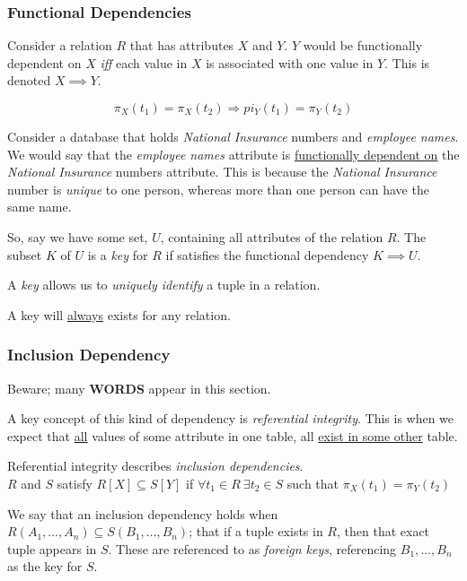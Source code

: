 \documentclass{article}
\begin{document}
\subsubsection*{Functional Dependencies}

Consider a relation $R$ that has attributes $X$ and $Y$. $Y$ would be functionally dependent on $X$ \textit{iff} each value in $X$ is associated with one value in $Y$. This is denoted $X \implies Y$.

$$\pi_X(t_1) = \pi_X(t_2) \Rightarrow pi_Y(t_1) = \pi_Y(t_2)$$

Consider a database that holds \textit{National Insurance} numbers and \textit{employee names}. We would say that the \textit{employee names} attribute is \underline{functionally dependent on} the \textit{National Insurance} numbers attribute. This is because the \textit{National Insurance} number is \textit{unique} to one person, whereas more than one person can have the same name.

So, say we have some set, $U$, containing all attributes of the relation $R$. The subset $K$ of $U$ is a \textit{key} for $R$ if satisfies the functional dependency $K \implies U$.

A \textit{key} allows us to \textit{uniquely identify} a tuple in a relation.

A key will \underline{always} exists for any relation.

\subsubsection*{Inclusion Dependency}

Beware; many \textbf{WORDS} appear in this section.

A key concept of this kind of dependency is \textit{referential integrity}. This is when we expect that \underline{all} values of some attribute in one table, all \underline{exist in some other} table.

Referential integrity describes \textit{inclusion dependencies}.\\

$R$ and $S$ satisfy $R[X] \subseteq S[Y]$ if $\forall t_1 \in R \: \exists t_2\in S $ such that $\pi_X(t_1) = \pi_Y(t_2)$

We say that an inclusion dependency holds when $R(A_1, \ldots, A_n) \subseteq S(B_1, \ldots, B_n)$; that if a tuple exists in $R$, then that exact tuple appears in $S$. These are referenced to as \textit{foreign keys}, referencing $B_1, \ldots, B_n$ as the key for $S$.
\end{document}

